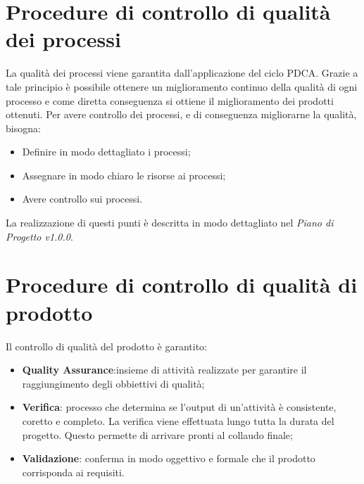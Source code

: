 \section{Procedure di controllo di qualità dei processi}
La qualità dei processi viene garantita dall'applicazione del ciclo PDCA. Grazie a tale principio è possibile ottenere un miglioramento continuo della qualità di ogni processo e come diretta conseguenza si ottiene il miglioramento dei prodotti ottenuti.
Per avere controllo dei processi, e di conseguenza migliorarne la qualità, bisogna: 
\begin{itemize}
	\item Definire in modo dettagliato i processi;
	\item Assegnare in modo chiaro le risorse ai processi;
	\item Avere controllo sui processi.
\end{itemize} 
La realizzazione di questi punti è descritta in modo dettagliato nel \textit{Piano di Progetto v1.0.0}.
\section{Procedure di controllo di qualità di prodotto}
Il controllo di qualità del prodotto è garantito: 
\begin{itemize}
	\item \textbf{Quality Assurance}:insieme di attività realizzate per garantire il raggiungimento degli obbiettivi di qualità;
	\item \textbf{Verifica}: processo che determina se l'output di un'attività è consistente, coretto e completo. La verifica viene effettuata lungo tutta la durata del progetto. Questo permette di arrivare pronti al collaudo finale;
	\item \textbf{Validazione}: conferma in modo oggettivo e formale che il prodotto corrisponda ai requisiti.
\end{itemize}
  
